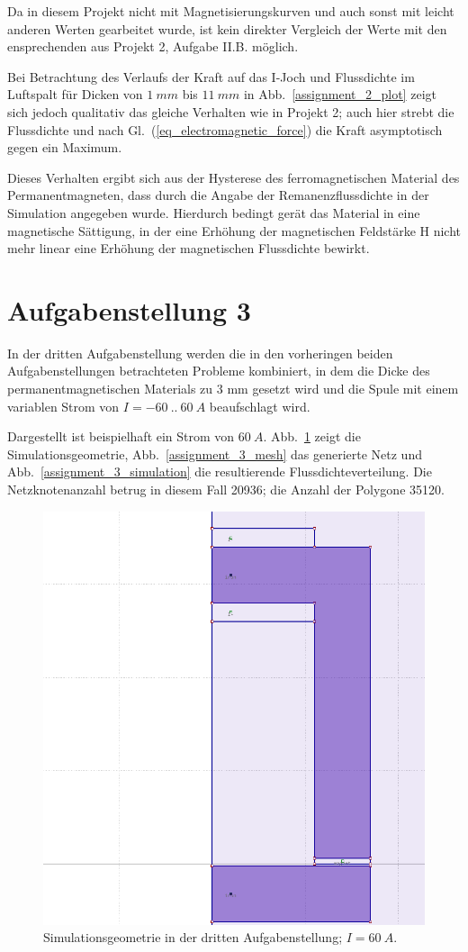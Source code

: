 \documentclass[conference,a4paper,twoside]{IEEEtran}
\begin{document}
Da in diesem Projekt nicht mit Magnetisierungskurven und auch sonst mit leicht anderen Werten gearbeitet wurde, ist kein direkter Vergleich der Werte mit den ensprechenden aus Projekt 2, Aufgabe II.B. möglich.

Bei Betrachtung des Verlaufs der Kraft auf das I-Joch und Flussdichte im Luftspalt für Dicken von $1\ mm$ bis $11\ mm$ in Abb.~\ref{assignment_2_plot} zeigt sich jedoch qualitativ das gleiche Verhalten wie in Projekt 2; auch hier strebt die Flussdichte und nach Gl.~(\ref{eq_electromagnetic_force}) die Kraft asymptotisch gegen ein Maximum.

Dieses Verhalten ergibt sich aus der Hysterese des ferromagnetischen Material des Permanentmagneten, dass durch die Angabe der Remanenzflussdichte in der Simulation angegeben wurde. Hierdurch bedingt gerät das Material in eine magnetische Sättigung, in der eine Erhöhung der magnetischen Feldstärke H nicht mehr linear eine Erhöhung der magnetischen Flussdichte bewirkt.

\section{Aufgabenstellung 3}

In der dritten Aufgabenstellung werden die in den vorheringen beiden Aufgabenstellungen betrachteten Probleme kombiniert, in dem die Dicke des permanentmagnetischen Materials zu 3 mm gesetzt wird und die Spule mit einem variablen Strom von $I = -60\ ..\ 60\ A$ beaufschlagt wird.

Dargestellt ist beispielhaft ein Strom von $60\ A$. Abb.~\ref{assignment_3_geometry} zeigt die Simulationsgeometrie, Abb.~\ref{assignment_3_mesh} das generierte Netz und Abb.~\ref{assignment_3_simulation} die resultierende Flussdichteverteilung. Die Netzknotenanzahl betrug in diesem Fall 20936; die Anzahl der Polygone 35120.

\begin{figure}
\centerline{\includegraphics[width=0.7\columnwidth]{../assets/assignment_3_geometry.png}}
\caption{Simulationsgeometrie in der dritten Aufgabenstellung; $I = 60\ A$.}
\label{assignment_3_geometry}
\end{figure}
\end{document}

